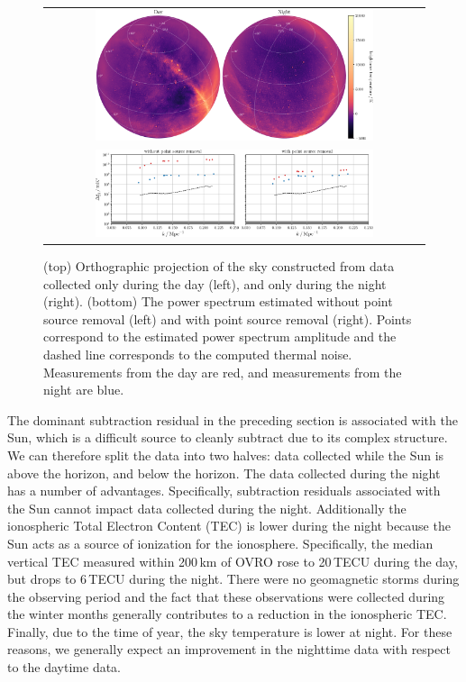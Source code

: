 \begin{bibunit}
\begin{figure}
    \centering
    \begin{tabular}{c}
        \includegraphics[width=0.75\textwidth]{figures/chapter4/day-night}\\
        \includegraphics[width=0.75\textwidth]{figures/chapter4/spherical-power-spectrum-day-night}\\
    \end{tabular}
    \caption{
        (top) Orthographic projection of the sky constructed from data collected only during the day
        (left), and only during the night (right).
        (bottom) The power spectrum estimated without point source removal (left) and with point
        source removal (right). Points correspond to the estimated power spectrum amplitude and the
        dashed line corresponds to the computed thermal noise. Measurements from the day are red,
        and measurements from the night are blue.
    }
    \label{fig:spherical-power-spectra-day-night}
\end{figure}

The dominant subtraction residual in the preceding section is associated with the Sun, which is a
difficult source to cleanly subtract due to its complex structure. We can therefore split the data
into two halves: data collected while the Sun is above the horizon, and below the horizon. The data
collected during the night has a number of advantages. Specifically, subtraction residuals
associated with the Sun cannot impact data collected during the night.  Additionally the ionospheric
Total Electron Content (TEC) is lower during the night because the Sun acts as a source of
ionization for the ionosphere. Specifically, the median vertical TEC measured within 200\,km of OVRO
rose to 20\,TECU during the day, but drops to 6\,TECU during the night. There were no geomagnetic
storms during the observing period and the fact that these observations were collected during the
winter months generally contributes to a reduction in the ionospheric TEC.  Finally, due to the time
of year, the sky temperature is lower at night. For these reasons, we generally expect an
improvement in the nighttime data with respect to the daytime data.


\end{bibunit}
